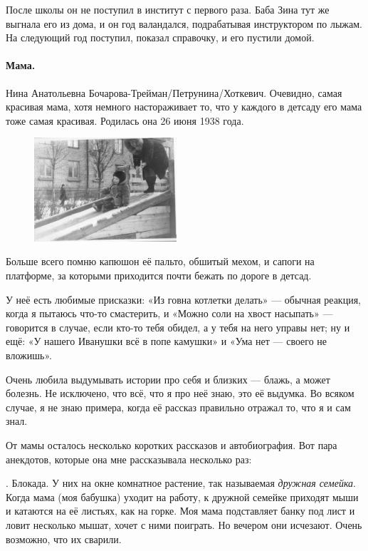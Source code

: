 \documentclass{book}
\begin{document}
После школы он не поступил в институт с первого раза.
Баба Зина тут же выгнала его из дома, и он год валандался, подрабатывая инструктором по лыжам.
На следующий год поступил, показал справочку, и его пустили домой.

\paragraph{Мама.}  Нина Анатольевна Бочарова-Трейман/Петрунина/Хоткевич.
Очевидно, самая красивая мама,
хотя немного настораживает то, что у каждого в детсаду его мама тоже самая красивая.
Родилась она 26 июня 1938 года.


\begin{figure}
\vskip-0mm
\centering
\includegraphics[width=53mm,angle=0]{pics/tosha-mama-detsad}
\end{figure}

Больше всего помню капюшон её пальто, обшитый мехом, и 
сапоги на платформе, за которыми приходится почти бежать по дороге в детсад.

У неё есть любимые присказки: «Из говна котлетки делать» --- обычная реакция, когда я пытаюсь что-то смастерить, и «Можно соли на хвост насыпать» --- говорится в случае, если кто-то тебя обидел, а у тебя на него управы нет;
ну и ещё:
«У нашего Иванушки всё в попе камушки» и
«Ума нет --- своего не вложишь».

Очень любила выдумывать истории про себя и близких --- блажь, а может болезнь.
Не исключено, что всё, что я про неё знаю, это её выдумка.
Во всяком случае, я не знаю примера, когда её рассказ правильно отражал то, что я и сам знал.

От мамы осталось несколько коротких рассказов и автобиография.
Вот пара анекдотов, которые она мне рассказывала несколько раз:

.
Блокада. 
У них на окне комнатное растение, так называемая \textit{дружная семейка}.
Когда мама (моя бабушка) уходит на работу, к дружной семейке приходят мыши и катаются на её листьях, как на горке.
Моя мама подставляет банку под лист и ловит несколько мышат, хочет с ними поиграть.
Но вечером они исчезают.
Очень возможно, что их сварили.
\end{document}
